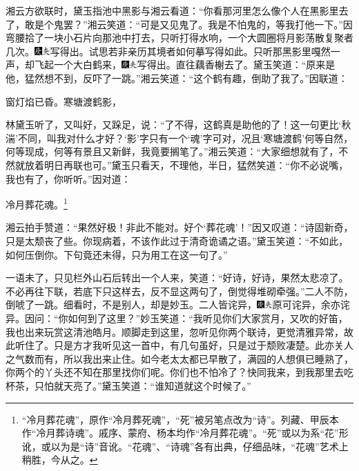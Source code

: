 湘云方欲联时，黛玉指池中黑影与湘云看道：“你看那河里怎么像个人在黑影里去了，敢是个鬼罢？”湘云笑道：“可是又见鬼了。我是不怕鬼的，等我打他一下。”因弯腰拾了一块小石片向那池中打去，只听打得水响，一个大圆圈将月影荡散复聚者几次。{\includegraphics[width=3mm]{../Images/00004}\includegraphics[width=3mm]{../Images/00012}\footnotesize \kaishu 写得出。试思若非亲历其境者如何摹写得如此。}只听那黑影里嘎然一声，却飞起一个大白鹤来，{\includegraphics[width=3mm]{../Images/00004}\includegraphics[width=3mm]{../Images/00012}\footnotesize \kaishu 写得出。}直往藕香榭去了。黛玉笑道：“原来是他，猛然想不到，反吓了一跳。”湘云笑道：“这个鹤有趣，倒助了我了。”因联道：

窗灯焰已昏。寒塘渡鹤影，

林黛玉听了，又叫好，又跺足，说：“了不得，这鹤真是助他的了！这一句更比‘秋湍’不同，叫我对什么才好？‘影’字只有一个‘魂’字可对，况且‘寒塘渡鹤’何等自然，何等现成，何等有景且又新鲜，我竟要搁笔了。”湘云笑道：“大家细想就有了，不然就放着明日再联也可。”黛玉只看天，不理他，半日，猛然笑道：“你不必说嘴，我也有了，你听听。”因对道：

冷月葬花魂。\footnote{“冷月葬花魂”，原作“冷月葬死魂”，“死”被另笔点改为“诗”。列藏、甲辰本作“冷月葬诗魂”。戚序、蒙府、杨本均作“冷月葬花魂”。“死”或以为系“花”形讹，或以为是“诗”音讹。“花魂”、“诗魂”各有出典，仔细品味，“花魂”艺术上稍胜，今从之。}

湘云拍手赞道：“果然好极！非此不能对。好个‘葬花魂’！”因又叹道：“诗固新奇，只是太颓丧了些。你现病着，不该作此过于清奇诡谲之语。”黛玉笑道：“不如此，如何压倒你。下句竟还未得，只为用工在这一句了。”

一语未了，只见栏外山石后转出一个人来，笑道：“好诗，好诗，果然太悲凉了。不必再往下联，若底下只这样去，反不显这两句了，倒觉得堆砌牵强。”二人不防，倒唬了一跳。细看时，不是别人，却是妙玉。二人皆诧异，{\includegraphics[width=3mm]{../Images/00004}\includegraphics[width=3mm]{../Images/00012}\footnotesize \kaishu 原可诧异，余亦诧异。}因问：“你如何到了这里？”妙玉笑道：“我听见你们大家赏月，又吹的好笛，我也出来玩赏这清池皓月。顺脚走到这里，忽听见你两个联诗，更觉清雅异常，故此听住了。只是方才我听见这一首中，有几句虽好，只是过于颓败凄楚。此亦关人之气数而有，所以我出来止住。如今老太太都已早散了，满园的人想俱已睡熟了，你两个的丫头还不知在那里找你们呢。你们也不怕冷了？快同我来，到我那里去吃杯茶，只怕就天亮了。”黛玉笑道：“谁知道就这个时候了。”

